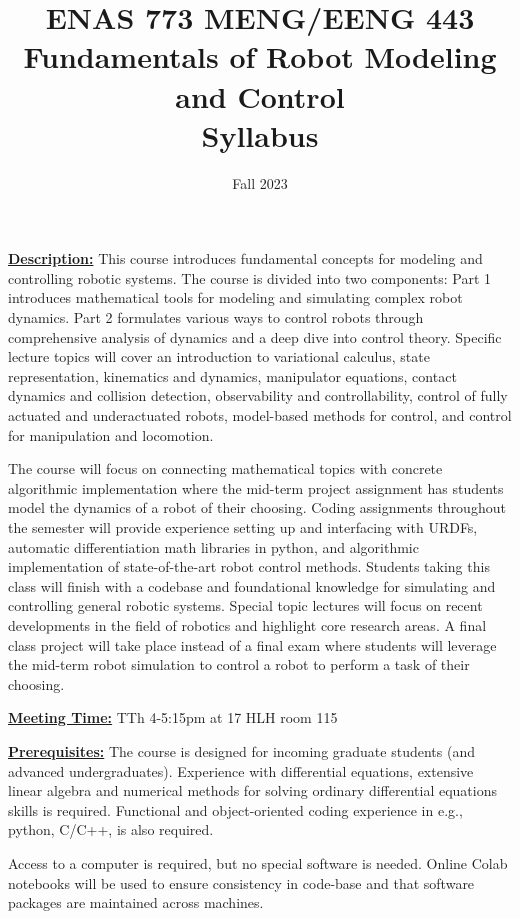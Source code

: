 \documentclass[11pt,letterpaper]{article}
\title{ENAS 773 MENG/EENG 443  \\ Fundamentals of Robot Modeling and Control \\ Syllabus}
\author{Fall 2023}
\date{}
\newcommand{\mysec}[1]{\medskip\noindent\underline{\textbf{#1}}}
\begin{document}
\maketitle

\vspace{-5mm}
\mysec{Description:}
This course introduces fundamental concepts for modeling and controlling robotic systems. The course is divided into two components: Part 1 introduces mathematical tools for modeling and simulating complex robot dynamics. Part 2 formulates various ways to control robots through comprehensive analysis of dynamics and a deep dive into control theory.  Specific lecture topics will cover an introduction to variational calculus, state representation, kinematics and dynamics, manipulator equations, contact dynamics and collision detection, observability and controllability, control of fully actuated and underactuated robots, model-based methods for control, and control for manipulation and locomotion. 

The course will focus on connecting mathematical topics with concrete algorithmic implementation where the mid-term project assignment has students model the dynamics of a robot of their choosing. Coding assignments throughout the semester will provide experience setting up and interfacing with URDFs, automatic differentiation math libraries in python, and algorithmic implementation of state-of-the-art robot control methods. Students taking this class will finish with a codebase and foundational knowledge for simulating and controlling general robotic systems. Special topic lectures will focus on recent developments in the field of robotics and highlight core research areas. A final class project will take place instead of a final exam where students will leverage the mid-term robot simulation to control a robot to perform a task of their choosing. 

\mysec{Meeting Time:} TTh 4-5:15pm at 17 HLH room 115

\mysec{Prerequisites:} The course is designed for incoming graduate students (and advanced undergraduates). Experience with differential equations, extensive linear algebra and numerical methods for solving ordinary differential equations skills is required. Functional and object-oriented coding experience in e.g., python, C/C++, is also required.

Access to a computer is required, but no special software is needed. Online Colab notebooks will be used to ensure consistency in code-base and that software packages are maintained across machines. 
\end{document}
